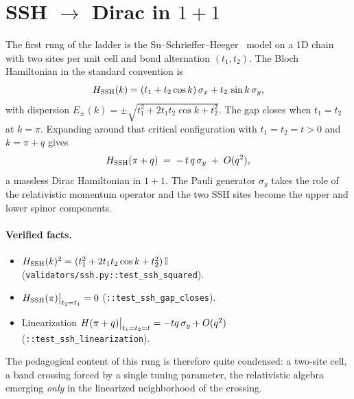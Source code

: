 \section{SSH \texorpdfstring{$\rightarrow$}{->} Dirac in \texorpdfstring{$1{+}1$}{(1+1)}}
\label{p:ssh}

The first rung of the ladder is the
Su--Schrieffer--Heeger~\cite{SuSchriefferHeeger1979} model on a 1D chain
with two sites per unit cell and bond alternation $(t_1, t_2)$.
The Bloch Hamiltonian in the standard convention is
\begin{equation}
H_{\mathrm{SSH}}(k)
    = (t_1 + t_2 \cos k)\,\sigma_x + t_2\,\sin k\,\sigma_y ,
\label{p:eq:HSSH}
\end{equation}
with dispersion
$E_{\pm}(k) = \pm\sqrt{t_1^2 + 2 t_1 t_2 \cos k + t_2^2}$.
The gap closes when $t_1 = t_2$ at $k = \pi$. Expanding around that
critical configuration with $t_1 = t_2 = t > 0$ and $k = \pi + q$ gives
\begin{equation}
H_{\mathrm{SSH}}(\pi + q) \;=\; -\,t\,q\,\sigma_y \;+\; O(q^2),
\label{p:eq:SSH-Dirac1+1}
\end{equation}
a massless Dirac Hamiltonian in $1{+}1$. The Pauli generator
$\sigma_y$ takes the role of the relativistic momentum operator and the
two SSH sites become the upper and lower spinor components.

\paragraph{Verified facts.}
\begin{itemize}[leftmargin=*]
  \item $H_{\mathrm{SSH}}(k)^{2}=(t_1^{2}+2 t_1 t_2 \cos k + t_2^{2})\,\mathbb{I}$
    (\texttt{validators/ssh.py::test\_ssh\_squared}).
  \item $H_{\mathrm{SSH}}(\pi)\big|_{t_2=t_1}=0$
    (\texttt{::test\_ssh\_gap\_closes}).
  \item Linearization $H(\pi+q)\big|_{t_1=t_2=t}=-tq\,\sigma_y+O(q^2)$
    (\texttt{::test\_ssh\_linearization}).
\end{itemize}

The pedagogical content of this rung is therefore quite condensed: a
two-site cell, a band crossing forced by a single tuning parameter, the
relativistic algebra emerging \emph{only} in the linearized neighborhood
of the crossing.
